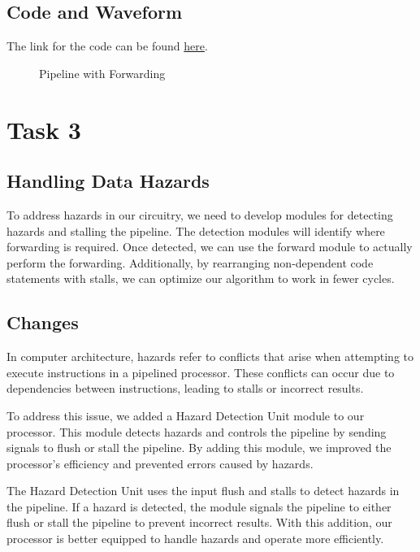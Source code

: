 \documentclass{report}
\begin{document}
\subsection{Code and Waveform}
The link for the code can be found \href{https://github.com/AliMuhammadAsad/Computer-Architecture-Spring-23/tree/main/RISC_V%20Pipelined%20Processor}{here}.
\begin{figure}[h]
    \centering
    \caption{Pipeline with Forwarding}
    \label{fig: Pipeline with Forwarding}
\end{figure}

\section{Task 3}

\subsection{Handling Data Hazards}

To address hazards in our circuitry, we need to develop modules for detecting hazards and stalling the pipeline. The detection modules will identify where forwarding is required. Once detected, we can use the forward module to actually perform the forwarding. Additionally, by rearranging non-dependent code statements with stalls, we can optimize our algorithm to work in fewer cycles.

\subsection{Changes}

In computer architecture, hazards refer to conflicts that arise when attempting to execute instructions in a pipelined processor. These conflicts can occur due to dependencies between instructions, leading to stalls or incorrect results.

To address this issue, we added a Hazard Detection Unit module to our processor. This module detects hazards and controls the pipeline by sending signals to flush or stall the pipeline. By adding this module, we improved the processor's efficiency and prevented errors caused by hazards.

The Hazard Detection Unit uses the input flush and stalls to detect hazards in the pipeline. If a hazard is detected, the module signals the pipeline to either flush or stall the pipeline to prevent incorrect results. With this addition, our processor is better equipped to handle hazards and operate more efficiently.
\end{document}
